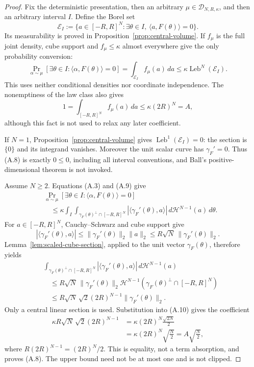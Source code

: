 \begin{proof}
Fix the deterministic presentation, then an arbitrary
$\mu\in\mathcal D_{N,R,\kappa}$, and then an arbitrary interval $I$.  Define
the Borel set
\[
\mathcal E_I:=\{a\in[-R,R]^N:\exists\theta\in I,
 \ \langle a,F(\theta)\rangle=0\}.
\]
Its measurability is proved in Proposition~\ref{prop:central-volume}.  If
$f_\mu$ is the full joint density, cube support and
$f_\mu\leq\kappa$ almost everywhere give the only probability conversion:
\[
\Pr_{\alpha\sim\mu}
[\exists\theta\in I:\langle\alpha,F(\theta)\rangle=0]
=\int_{\mathcal E_I}f_\mu(a)\,da
\leq\kappa\operatorname{Leb}^N(\mathcal E_I).
\tag{A.9}
\]
This uses neither conditional densities nor coordinate independence.  The
nonemptiness of the law class also gives
\[
1=\int_{[-R,R]^N}f_\mu(a)\,da
\leq\kappa(2R)^N=A,
\]
although this fact is not used to relax any later coefficient.

If $N=1$, Proposition~\ref{prop:central-volume} gives
$\operatorname{Leb}^1(\mathcal E_I)=0$: the section is $\{0\}$ and its
integrand vanishes.  Moreover the unit scalar curve has
$\gamma_F'=0$.  Thus (A.8) is exactly $0\leq0$, including all interval
conventions, and Ball's positive-dimensional theorem is not invoked.

Assume $N\geq2$.  Equations (A.3) and (A.9) give
\[
\begin{aligned}
&\Pr_{\alpha\sim\mu}
[\exists\theta\in I:\langle\alpha,F(\theta)\rangle=0]\\
&\quad\leq\kappa\int_I
\int_{\gamma_F(\theta)^\perp\cap[-R,R]^N}
|\langle\gamma_F'(\theta),a\rangle|
\,d\mathcal H^{N-1}(a)\,d\theta.
\end{aligned}
\tag{A.10}
\]
For $a\in[-R,R]^N$, Cauchy--Schwarz
\citep{rudin1976principles} and cube support give
\[
|\langle\gamma_F'(\theta),a\rangle|
\leq\|\gamma_F'(\theta)\|_2\|a\|_2
\leq R\sqrt N\,\|\gamma_F'(\theta)\|_2.
\tag{A.11}
\]
Lemma~\ref{lem:scaled-cube-section}, applied to the unit vector
$\gamma_F(\theta)$, therefore yields
\[
\begin{aligned}
&\int_{\gamma_F(\theta)^\perp\cap[-R,R]^N}
|\langle\gamma_F'(\theta),a\rangle|
\,d\mathcal H^{N-1}(a)\\
&\quad\leq
R\sqrt N\,\|\gamma_F'(\theta)\|_2
\mathcal H^{N-1}(\gamma_F(\theta)^\perp\cap[-R,R]^N)\\
&\quad\leq
R\sqrt N\,\sqrt2(2R)^{N-1}
\|\gamma_F'(\theta)\|_2.
\end{aligned}
\tag{A.12}
\]
Only a central linear section is used.  Substitution into (A.10) gives the
coefficient
\[
\begin{aligned}
\kappa R\sqrt N\,\sqrt2(2R)^{N-1}
&=\kappa(2R)^N\frac{\sqrt{2N}}2\\
&=\kappa(2R)^N\sqrt{\frac N2}
=A\sqrt{\frac N2},
\end{aligned}
\tag{A.13}
\]
where $R(2R)^{N-1}=(2R)^N/2$.  This is equality, not a term absorption, and
proves (A.8).  The upper bound need not be at most one and is not clipped.


\end{proof}
